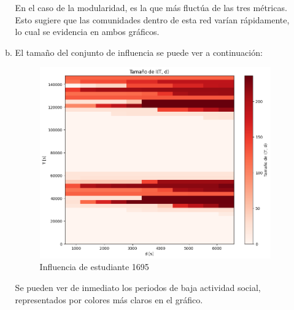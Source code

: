 \documentclass[10pt]{article}
\begin{document}
\begin{itemize}
\begin{enumerate}[(a)]
            En el caso de la modularidad, es la que más fluctúa de las tres métricas. Esto sugiere que las comunidades dentro de esta red varían rápidamente, lo cual se evidencia en ambos gráficos.
            \newpage
            \item El tamaño del conjunto de influencia se puede ver a continuación:
            \begin{figure}[H]
                \centering
                \includegraphics[scale=0.4]{images/influencia.png}
                \caption{Influencia de estudiante 1695}
                \label{fig:influencia}
            \end{figure}
            Se pueden ver de inmediato los periodos de baja actividad social, representados por colores más claros en el gráfico.
        \end{enumerate}
\end{itemize}
\end{document}
